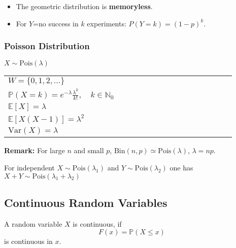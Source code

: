 \renewcommand{\arraystretch}{1}
\setlength\tabcolsep{\oldtabcolsep}
\begin{itemize}
    \item The geometric distribution is \textbf{memoryless}.
    \item For $Y$=no success in $k$ experiments: $P(Y=k)={(1-p)}^k$.
\end{itemize}

\subsubsection{Poisson Distribution}
$X \sim \mathrm{Pois}(\lambda)$

\renewcommand{\arraystretch}{1.3}
\setlength{\oldtabcolsep}{\tabcolsep}\setlength\tabcolsep{3pt}
\begin{tabularx}{\linewidth}{@{}p{0.5\linewidth}p{0.49\linewidth}@{}}
    $W=\{0,1,2,\ldots\}$                                                      &
    \multirow{4}{*}{
        
    }                                                                           \\
    $\mathbb{P}(X=k)=e^{-\lambda}\frac{\lambda^k}{k!},\quad k\in\mathbb{N}_0$ & \\
    $\mathbb{E}[X] = \lambda$                                                 & \\
    $\mathbb{E}[X(X-1)] = \lambda^2$                                          & \\
    $\mathrm{Var}(X) = \lambda$                                               &
\end{tabularx}
\renewcommand{\arraystretch}{1}
\setlength\tabcolsep{\oldtabcolsep}
\textbf{Remark:} For large $n$ and small $p$, $\mathrm{Bin}(n,p)\simeq \mathrm{Pois}(\lambda)$, $\lambda=np$.

For independent $X \sim \mathrm{Pois}(\lambda_1)$ and $Y \sim \mathrm{Pois}(\lambda_2)$ one has $X+Y \sim \mathrm{Pois}(\lambda_1 +\lambda_2)$

\subsection{Continuous Random Variables}
A random variable $X$ is continuous, if
\noindent\begin{equation*}
    F(x)=\mathbb{P}(X\leq x)
\end{equation*}
is continuous in $x$.



